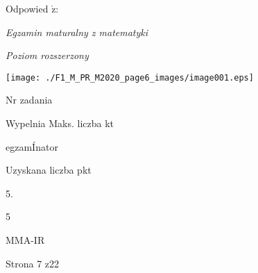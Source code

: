 \documentclass[a4paper,12pt]{article}
\begin{document}
Odpowied $\acute{\mathrm{z}}$:

{\it Egzamin maturalny z matematyki}

{\it Poziom rozszerzony}
\begin{center}
\texttt{[image: ./F1\_M\_PR\_M2020\_page6\_images/image001.eps]}
\end{center}
Nr zadania

Wypelnia Maks. liczba kt

egzamÍnator

Uzyskana liczba pkt

5.

5

MMA-IR

Strona 7 z22
\end{document}
